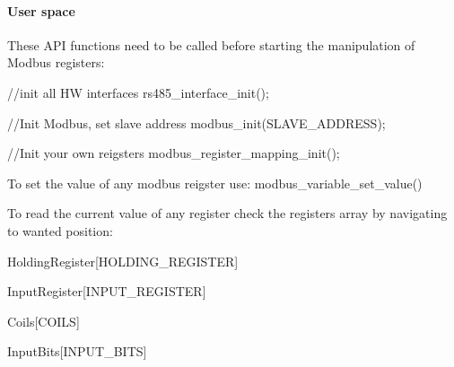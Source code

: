 \paragraph*{User space}

These A\+PI functions need to be called before starting the manipulation of Modbus registers\+: 
\begin{DoxyCode}
//init all HW interfaces
rs485\_interface\_init();

//Init Modbus, set slave address
modbus\_init(SLAVE\_ADDRESS);

//Init your own reigsters
modbus\_register\_mapping\_init();
\end{DoxyCode}


To set the value of any modbus reigster use\+: {\ttfamily modbus\+\_\+variable\+\_\+set\+\_\+value()}

To read the current value of any register check the register\textquotesingle{}s array by navigating to wanted position\+:
\begin{DoxyItemize}
\item Holding\+Register\mbox{[}H\+O\+L\+D\+I\+N\+G\+\_\+\+R\+E\+G\+I\+S\+T\+ER\mbox{]}
\item Input\+Register\mbox{[}I\+N\+P\+U\+T\+\_\+\+R\+E\+G\+I\+S\+T\+ER\mbox{]}
\item Coils\mbox{[}C\+O\+I\+LS\mbox{]}
\item Input\+Bits\mbox{[}I\+N\+P\+U\+T\+\_\+\+B\+I\+TS\mbox{]} 
\end{DoxyItemize}